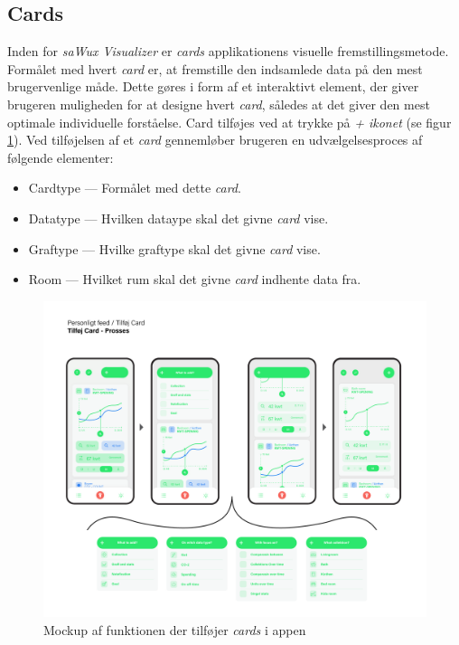 \subsection{Cards}
Inden for \emph{saWux Visualizer} er \emph{cards} applikationens visuelle fremstillingsmetode. Formålet med hvert \emph{card} er, at fremstille den indsamlede data på den mest brugervenlige måde. Dette gøres i form af et interaktivt element, der giver brugeren muligheden for at designe hvert \emph{card}, således at det giver den mest optimale individuelle forståelse. Card tilføjes ved at trykke på \emph{+ ikonet} (se figur \ref{img:teknisk:addcard}). Ved tilføjelsen af et \emph{card} gennemløber brugeren en udvælgelsesproces af følgende elementer:
\begin{itemize}
    \item Cardtype — Formålet med dette \emph {card}.
    \item Datatype — Hvilken dataype skal det givne \emph {card} vise.
    \item Graftype — Hvilke graftype skal det givne \emph {card} vise.
    \item Room — Hvilket rum skal det givne \emph {card} indhente data fra.
\end{itemize}
\begin{figure}[H]
    \centering
    \includegraphics[width=\textwidth]{Images/Add Card.png}
    \caption[Tilføj \emph{card} mockup]{Mockup af funktionen der tilføjer \emph{cards} i appen}
    \label{img:teknisk:addcard}
\end{figure}

